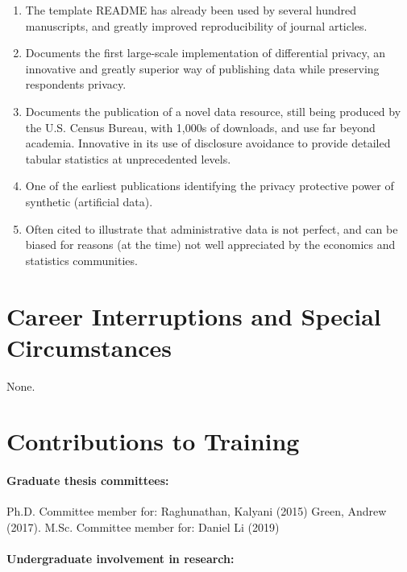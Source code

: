 \documentclass[12pt,letterpaper]{article}
\begin{document}
\begin{enumerate}
\item {}\newline The template README has already been used by several hundred manuscripts, and greatly improved reproducibility of journal articles.
\item {}\newline
Documents the first large-scale implementation of differential privacy, an innovative and greatly superior way of publishing data while preserving respondents privacy. 
\item {}\newline
Documents the publication of a novel data resource, still being produced by the U.S. Census Bureau, with 1,000s of downloads, and use far beyond academia. Innovative in its use of disclosure avoidance to provide detailed tabular statistics at unprecedented levels.
\item {}\newline
One of the earliest publications identifying the privacy protective power of synthetic (artificial data).
\item {}\newline
Often cited to illustrate that administrative data is not perfect, and can be biased for reasons (at the time) not well appreciated by the economics and statistics communities.
\end{enumerate}

\section{Career Interruptions and Special Circumstances}

None.

\section{Contributions to Training}

\paragraph{Graduate thesis committees:\ }

Ph.D. Committee member for: Raghunathan, Kalyani (2015)
Green, Andrew	(2017).
%
M.Sc. Committee member for: Daniel Li (2019)

\paragraph{Undergraduate involvement in research: }
\end{document}
